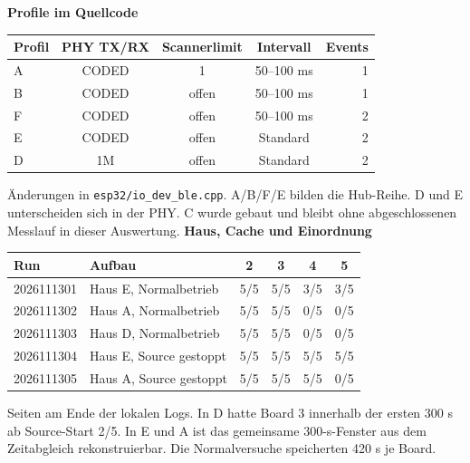 \documentclass[a4paper,11pt]{article}
\begin{document}
\textbf{Profile im Quellcode}

\begin{center}
\small
\begin{tabular}{lcccr}\toprule
Profil & PHY TX/RX & Scannerlimit & Intervall & Events \\ \midrule
A & CODED & 1 & 50--100 ms & 1 \\
B & CODED & offen & 50--100 ms & 1 \\
F & CODED & offen & 50--100 ms & 2 \\
E & CODED & offen & Standard & 2 \\
D & 1M & offen & Standard & 2 \\
\bottomrule\end{tabular}
\end{center}

{\small Änderungen in \texttt{esp32/io\_dev\_ble.cpp}. A/B/F/E bilden die Hub-Reihe. D und E unterscheiden sich in der PHY. C wurde gebaut und bleibt ohne abgeschlossenen Messlauf in dieser Auswertung.}
\newpage
\textbf{Haus, Cache und Einordnung}

\begin{center}\small
\begin{tabular}{llcccc}\toprule
Run & Aufbau & 2 & 3 & 4 & 5 \\ \midrule
2026111301 & Haus E, Normalbetrieb & 5/5 & 5/5 & 3/5 & 3/5 \\
2026111302 & Haus A, Normalbetrieb & 5/5 & 5/5 & 0/5 & 0/5 \\
2026111303 & Haus D, Normalbetrieb & 5/5 & 5/5 & 0/5 & 0/5 \\
2026111304 & Haus E, Source gestoppt & 5/5 & 5/5 & 5/5 & 5/5 \\
2026111305 & Haus A, Source gestoppt & 5/5 & 5/5 & 5/5 & 0/5 \\
\bottomrule\end{tabular}\end{center}

{\small Seiten am Ende der lokalen Logs. In D hatte Board 3 innerhalb der ersten 300 s ab Source-Start 2/5. In E und A ist das gemeinsame 300-s-Fenster aus dem Zeitabgleich rekonstruierbar. Die Normalversuche speicherten 420 s je Board.}
\end{document}
